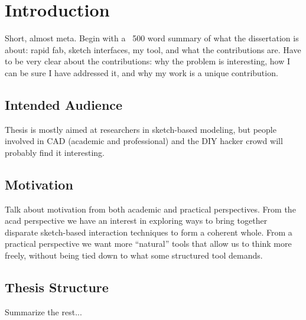 \chapter{Introduction}

Short, almost meta. Begin with a ~500 word summary of what the
dissertation is about: rapid fab, sketch interfaces, my tool, and what
the contributions are. Have to be very clear about the contributions:
why the problem is interesting, how I can be sure I have addressed it,
and why my work is a unique contribution.

\section{Intended Audience}

Thesis is mostly aimed at researchers in sketch-based modeling, but
people involved in CAD (academic and professional) and the DIY hacker
crowd will probably find it interesting.

\section{Motivation}

Talk about motivation from both academic and practical
perspectives. From the acad perspective we have an interest in
exploring ways to bring together disparate sketch-based interaction
techniques to form a coherent whole. From a practical perspective we
want more ``natural'' tools that allow us to think more freely,
without being tied down to what some structured tool demands.

\section{Thesis Structure}

Summarize the rest...

